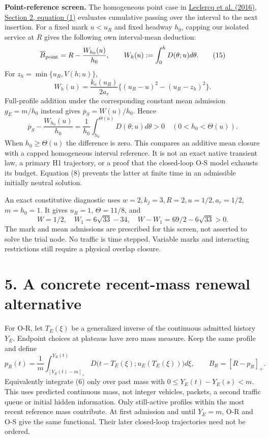 \documentclass[11pt,a4paper]{article}
\newcommand{\pos}[1]{[#1]_+}
\begin{document}
\textbf{Point-reference screen.} The homogeneous point case in
\href{https://repository.tudelft.nl/file/File_c424c1b3-7374-436b-a6a7-abdf69063aa6}{Leclercq et al. (2016), Section 2, equation (1)}
evaluates cumulative passing over the interval to the next insertion.
For a fixed mark $u<u_R$ and fixed headway $h_0$, capping our isolated
service at $R$ gives the following own interval-mean deduction:
\begin{equation}
 \overline B_{\rm point}=R-\frac{W_{h_0}(u)}{h_0},\qquad
 W_h(u):=\int_0^hD(\theta;u)d\theta. \tag{15}
\end{equation}
For $z_h=\min\{u_R,V(h;u)\}$,
\begin{equation}
 W_h(u)=\frac{k_c(u_R)}{2a_r}
       \{(u_R-u)^2-(u_R-z_h)^2\}. \tag{16}
\end{equation}
Full-profile addition under the corresponding constant mean admission
$g_E=m/h_0$ instead gives $\overline p_S=W(u)/h_0$. Hence
\begin{equation}
 \overline p_S-\frac{W_{h_0}(u)}{h_0}
   =\frac1{h_0}\int_{h_0}^{\Theta(u)}D(\theta;u)d\theta>0
 \quad(0<h_0<\Theta(u)). \tag{17}
\end{equation}
When $h_0\geq\Theta(u)$ the difference is zero. This compares an additive
mean closure with a capped homogeneous interval reference. It is not an
exact native transient law, a primary H1 trajectory, or a proof that the
closed-loop O-S model exhausts its budget. Equation (8) prevents the latter
at finite time in an admissible initially neutral solution.

An exact constitutive diagnostic uses $w=2,k_j=3,R=2,u=1/2,a_r=1/2$,
$m=h_0=1$. It gives $u_R=1$, $\Theta=11/8$, and
\begin{equation}
 W=1/2,\quad W_1=6\sqrt{33}-34,\quad
 W-W_1=69/2-6\sqrt{33}>0. \tag{18}
\end{equation}
The mark and mean admissions are prescribed for this screen, not asserted
to solve the trial node. No traffic is time stepped. Variable marks and
interacting restrictions still require a physical overlap closure.

\newpage
\section*{5. A concrete recent-mass renewal alternative}

For O-R, let $T_E(\xi)$ be a generalized inverse of the continuous
admitted history $Y_E$. Endpoint choices at plateaus have zero mass measure.
Keep the same profile and define
\begin{equation}
 p_R(t)=\frac1m\int_{\pos{Y_E(t)-m}}^{Y_E(t)}
     D\bigl(t-T_E(\xi);u_E(T_E(\xi))\bigr)d\xi,
 \qquad B_R=\pos{R-p_R}. \tag{19}
\end{equation}
Equivalently integrate (6) only over past mass with
$0\leq Y_E(t)-Y_E(s)<m$. This uses predicted continuous mass, not integer
vehicles, packets, a second traffic queue or initial hidden information.
Only still-active profiles within the most recent reference mass contribute.
At first admission and until $Y_E=m$, O-R and O-S give the same functional.
Their later closed-loop trajectories need not be ordered.
\end{document}
